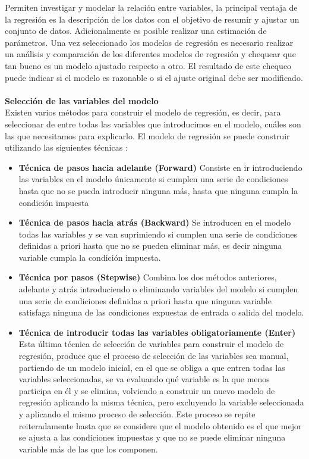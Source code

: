 Permiten investigar y modelar la relación entre variables, la principal ventaja de la regresión es la descripción de los datos con el 
objetivo de resumir y ajustar un conjunto de datos. Adicionalmente es posible realizar una estimación de parámetros. Una vez 
seleccionado los modelos de regresión es necesario realizar un análisis y comparación de los diferentes modelos de regresión y 
chequear que tan bueno es un modelo ajustado respecto a otro. El resultado de este chequeo puede indicar si el modelo es razonable 
o si el ajuste original debe ser modificado.\\
\textbf{\\Selección de las variables del modelo}\\
Existen varios métodos para construir el modelo de regresión, es decir, para seleccionar de entre todas las variables que introducimos 
en el modelo, cuáles son las que necesitamos para explicarlo. El modelo de regresión se puede construir utilizando las siguientes técnicas \cite{regresionmodel}: 
\begin{itemize}
\item{\textbf{Técnica de pasos hacia adelante (Forward)} 
Consiste en ir introduciendo las variables en el modelo únicamente si cumplen una serie de condiciones hasta que no se pueda introducir 
ninguna más, hasta que ninguna cumpla la condición impuesta
}
\item{
\textbf{Técnica de pasos hacia atrás (Backward)}
Se introducen en el modelo todas las variables y se van suprimiendo si cumplen una serie de condiciones definidas a priori hasta 
que no se pueden eliminar más, es decir ninguna variable cumpla la condición impuesta.
}
\item{\textbf{Técnica por pasos (Stepwise)}
Combina los dos métodos anteriores, adelante y atrás introduciendo o eliminando variables del modelo si cumplen una serie de 
condiciones definidas a priori hasta que ninguna variable satisfaga ninguna de las condiciones expuestas de entrada o salida del modelo.
}
\item{\textbf{Técnica de introducir todas las variables obligatoriamente (Enter)}
Esta última técnica de selección de variables para construir el modelo de regresión, produce que el proceso de selección de las variables 
sea manual, partiendo de un modelo inicial, en el que se obliga a que entren todas las variables seleccionadas, se va evaluando qué variable 
es la que menos participa en él y se elimina, volviendo a construir un nuevo modelo de regresión aplicando la misma técnica, pero excluyendo 
la variable seleccionada y aplicando el mismo proceso de selección. Este proceso se repite reiteradamente hasta que se considere que el modelo 
obtenido es el que mejor se ajusta a las condiciones impuestas y que no se puede eliminar ninguna variable más de las que los componen.
}
\end{itemize}
